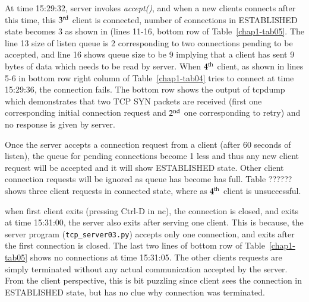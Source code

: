 \begin{multicols}{2}

At time 15:29:32, server invokes \textit{accept()}, and when a new clients connects after this time, this $3^{\rm rd}$ client is connected, number of connections in ESTABLISHED state becomes 3 as shown in (lines 11-16, bottom row of Table~\ref{chap1-tab05}. The line 13 size of listen queue is 2 corresponding to two connections pending to be accepted, and line 16 shows queue size to be 9 implying that a client has sent 9 bytes of data which needs to be read by server. When $4^{\rm th}$ client, as shown in lines 5-6 in bottom row right column of Table~\ref{chap1-tab04} tries to connect at time 15:29:36, the connection fails. The bottom row shows the output of tcpdump which demonstrates that two TCP SYN packets are received (first one corresponding initial connection request and $2^{\rm nd}$ one corresponding to retry) and no response is given by server.

Once the server accepts a connection request from a client (after 60 seconds of listen), the queue for pending connections become 1 less and thus any new client request will be accepted and it will show ESTABLISHED state. Other client connection requests will be ignored as queue has become has full. Table ?????? shows three client requests in connected state, where as $4^{\rm th}$ client is unsuccessful.


when first client exits (pressing Ctrl-D in nc), the connection is closed,  and exits at time 15:31:00, the server also exits after serving one client. This is because, the server program (\texttt{tcp\_server03.py}) accepts only one connection, and exits after the first connection is closed. The last two lines of bottom row of Table~\ref{chap1-tab05} shows no connections at time 15:31:05. The other clients requests are simply terminated without any actual communication accepted by the server. From the client perspective, this is bit puzzling since client sees the connection in ESTABLISHED state, but has no clue why connection was terminated.


\end{multicols}
